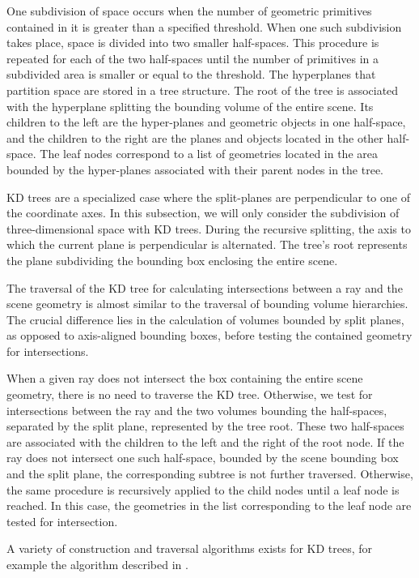 One subdivision of space occurs when the number of geometric primitives contained in it is greater than a specified threshold. When one such subdivision takes place, space is divided into two smaller half-spaces. This procedure is repeated for each of the two half-spaces until the number of primitives in a subdivided area is smaller or equal to the threshold. The hyperplanes that partition space are stored in a tree structure. The root of the tree is associated with the hyperplane splitting the bounding volume of the entire scene. Its children to the left are the hyper-planes and geometric objects in one half-space, and the children to the right are the planes and objects located in the other half-space. The leaf nodes correspond to a list of geometries located in the area bounded by the hyper-planes associated with their parent nodes in the tree.

KD trees are a specialized case where the split-planes are perpendicular to one of the coordinate axes. In this subsection, we will only consider the subdivision of three-dimensional space with KD trees. During the recursive splitting, the axis to which the current plane is perpendicular is alternated. The tree's root represents the plane subdividing the bounding box enclosing the entire scene.

The traversal of the KD tree for calculating intersections between a ray and the scene geometry is almost similar to the traversal of bounding volume hierarchies. The crucial difference lies in the calculation of volumes bounded by split planes, as opposed to axis-aligned bounding boxes, before testing the contained geometry for intersections.

When a given ray does not intersect the box containing the entire scene geometry, there is no need to traverse the KD tree. Otherwise, we test for intersections between the ray and the two volumes bounding the half-spaces, separated by the split plane, represented by the tree root. These two half-spaces are associated with the children to the left and the right of the root node. If the ray does not intersect one such half-space, bounded by the scene bounding box and the split plane, the corresponding subtree is not further traversed. Otherwise, the same procedure is recursively applied to the child nodes until a leaf node is reached. In this case, the geometries in the list corresponding to the leaf node are tested for intersection.

A variety of construction and traversal algorithms exists for KD trees, for example the algorithm described in \cite{wald2006building}.


